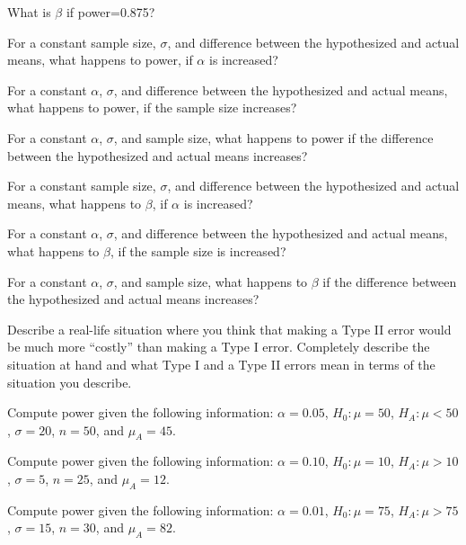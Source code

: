 \documentclass[10pt,openany]{book}\usepackage[]{graphicx}\usepackage[]{color}
\begin{document}
\begin{exsection}
  \item \label{revex:HypTPower1} What is $\beta$ if power=0.875? 
  \item \label{revex:HypTPowerAlpha} For a constant sample size, $\sigma$, and difference between the hypothesized and actual means, what happens to power, if $\alpha$ is increased?  
  \item \label{revex:HypTPowern} For a constant $\alpha$, $\sigma$, and difference between the hypothesized and actual means, what happens to power, if the sample size increases? 
  \item \label{revex:HypTPowerMu} For a constant $\alpha$, $\sigma$, and sample size, what happens to power if the difference between the hypothesized and actual means increases? 
  \item \label{revex:HypTBetaAlpha} For a constant sample size, $\sigma$, and difference between the hypothesized and actual means, what happens to $\beta$, if $\alpha$ is increased? 
  \item \label{revex:HypTBetan} For a constant $\alpha$, $\sigma$, and difference between the hypothesized and actual means, what happens to $\beta$, if the sample size is increased? 
  \item \label{revex:HypTBetaMu} For a constant $\alpha$, $\sigma$, and sample size, what happens to $\beta$ if the difference between the hypothesized and actual means increases? 
  \item \label{revex:HypTRealLife} Describe a real-life situation where you think that making a Type II error would be much more ``costly'' than making a Type I error.  Completely describe the situation at hand and what Type I and a Type II errors mean in terms of the situation you describe. 
  \item \label{revex:HypTCalcPwr1} Compute power given the following information: $\alpha=0.05$, $H_{0}:\mu=50$, $H_{A}:\mu<50$, $\sigma=20$, $n=50$, and $\mu_{A}=45$. 
  \item \label{revex:HypTCalcPwr2} Compute power given the following information: $\alpha=0.10$, $H_{0}:\mu=10$, $H_{A}:\mu>10$, $\sigma=5$, $n=25$, and $\mu_{A}=12$. 
  \item \label{revex:HypTCalcPwr3} Compute power given the following information: $\alpha=0.01$, $H_{0}:\mu=75$, $H_{A}:\mu>75$, $\sigma=15$, $n=30$, and $\mu_{A}=82$. 
\end{exsection}
\end{document}
